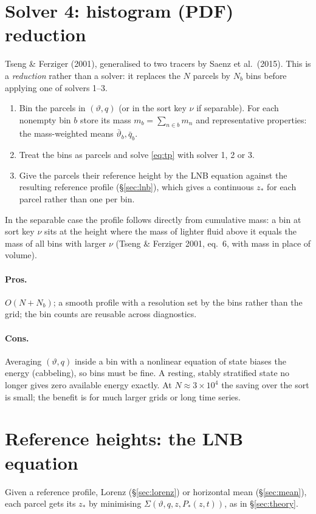 \documentclass[11pt,a4paper]{article}
\newcommand{\vt}{\vartheta}
\newcommand{\zs}{z_{*}}
\begin{document}
\section{Solver 4: histogram (PDF) reduction}\label{sec:histogram}
Tseng \& Ferziger (2001), generalised to two tracers by Saenz et al.\ (2015). This is a \emph{reduction} rather than a solver:
it replaces the $N$ parcels by $N_b$ bins before applying one of solvers 1--3.
\begin{enumerate}
  \item Bin the parcels in $(\vt,q)$ (or in the sort key $\nu$ if separable). For each nonempty bin $b$ store its mass
        $m_b=\sum_{n\in b}m_n$ and representative properties: the mass-weighted means $\bar\vt_b,\bar q_b$.
  \item Treat the bins as parcels and solve \eqref{eq:tp} with solver 1, 2 or 3.
  \item Give the parcels their reference height by the LNB equation against the resulting reference profile
        (\S\ref{sec:lnb}), which gives a continuous $\zs$ for each parcel rather than one per bin.
\end{enumerate}
In the separable case the profile follows directly from cumulative mass: a bin at sort key $\nu$ sits at the height where the
mass of lighter fluid above it equals the mass of all bins with larger $\nu$ (Tseng \& Ferziger 2001, eq.\ 6, with mass in
place of volume).
\paragraph{Pros.} $O(N+N_b)$; a smooth profile with a resolution set by the bins rather than the grid; the bin counts are
reusable across diagnostics.
\paragraph{Cons.} Averaging $(\vt,q)$ inside a bin with a nonlinear equation of state biases the energy (cabbeling), so bins
must be fine. A resting, stably stratified state no longer gives zero available energy exactly. At $N\approx3\times10^4$ the saving over
the sort is small; the benefit is for much larger grids or long time series.

\section{Reference heights: the LNB equation}\label{sec:lnb-sec}
Given a reference profile, Lorenz (\S\ref{sec:lorenz}) or horizontal mean (\S\ref{sec:mean}), each parcel gets its $\zs$ by
minimising $\Sigma(\vt,q,z,P_*(z,t))$, as in \S\ref{sec:theory}.
\end{document}
